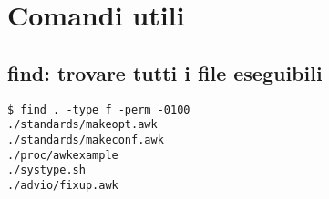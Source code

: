 \section{Comandi utili}

\subsection{find: trovare tutti i file eseguibili}
	
\begin{lstlisting}
$ find . -type f -perm -0100
./standards/makeopt.awk
./standards/makeconf.awk
./proc/awkexample
./systype.sh
./advio/fixup.awk
\end{lstlisting}

	
